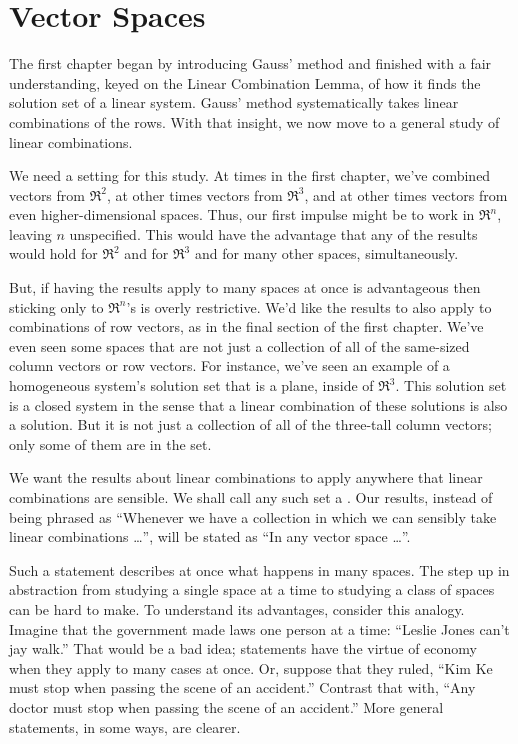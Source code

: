 \chapter{Vector Spaces}
The first chapter began by introducing Gauss' method and finished with a fair
understanding, keyed on the Linear Combination Lemma, 
of how it finds the solution set of a linear system.
Gauss' method systematically takes linear combinations of the rows.
With that insight, we now move to a general study of linear 
combinations.

We need a setting for this study.
At times in the first chapter, we've combined vectors from $\Re^2$, 
at other times vectors from $\Re^3$,
and at other times vectors from even higher-dimensional spaces. 
Thus, our first impulse might be 
to work in $\Re^n$, leaving $n$ unspecified.
This would have the advantage that any of the results 
would hold for $\Re^2$ and for $\Re^3$ and for many other spaces,
simultaneously.

But, if having the results apply to many spaces at once is
advantageous then sticking only to $\Re^n$'s is overly restrictive. 
We'd like the results to also apply to combinations of row vectors,
as in the final section of the first chapter.
We've even seen some spaces that are not just a collection of all of the
same-sized column vectors or row vectors.
For instance, we've seen an example of a homogeneous system's solution
set that is a plane, inside of $\Re^3$.
This solution set is a closed system in the sense that 
a linear combination of these solutions is also a solution. 
But it is not just a collection of all of the three-tall column vectors; 
only some of them are in the set.

We want the results about linear combinations to apply anywhere that linear
combinations are sensible. 
We shall call any such set a .
Our results, instead of being phrased as
``Whenever we have a collection in which we can sensibly take linear 
combinations \ldots'', will be stated as
``In any vector space \ldots''.

Such a statement describes at once what
happens in many spaces.
The step up in abstraction from studying a single space at a time 
to studying a class of spaces can be hard to make.
To understand its advantages, consider this analogy.
Imagine that the government made laws one person at a time:
``Leslie Jones can't jay walk.''
That would be a bad idea; 
statements have the virtue of economy when they apply to many cases at once.
Or, suppose that they ruled, ``Kim Ke must stop when passing 
the scene of an accident.''
Contrast that with, ``Any doctor must stop when passing 
the scene of an accident.''
More general statements, in some ways, are clearer.














